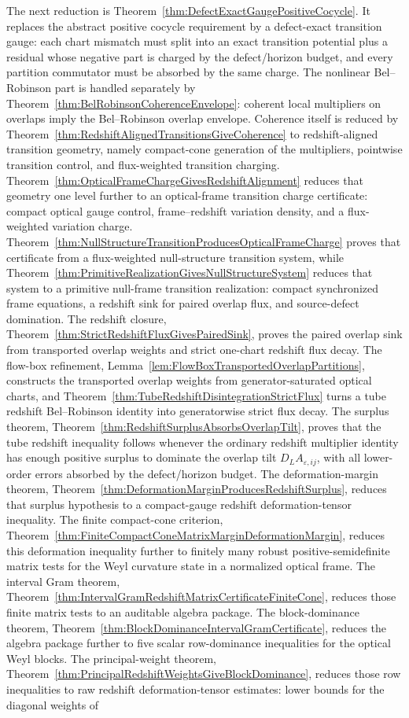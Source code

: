 The next reduction is Theorem~\ref{thm:DefectExactGaugePositiveCocycle}. It replaces the abstract positive cocycle requirement by a defect-exact transition gauge: each chart mismatch must split into an exact transition potential plus a residual whose negative part is charged by the defect/horizon budget, and every partition commutator must be absorbed by the same charge. The nonlinear Bel--Robinson part is handled separately by Theorem~\ref{thm:BelRobinsonCoherenceEnvelope}: coherent local multipliers on overlaps imply the Bel--Robinson overlap envelope. Coherence itself is reduced by Theorem~\ref{thm:RedshiftAlignedTransitionsGiveCoherence} to redshift-aligned transition geometry, namely compact-cone generation of the multipliers, pointwise transition control, and flux-weighted transition charging. Theorem~\ref{thm:OpticalFrameChargeGivesRedshiftAlignment} reduces that geometry one level further to an optical-frame transition charge certificate: compact optical gauge control, frame--redshift variation density, and a flux-weighted variation charge. Theorem~\ref{thm:NullStructureTransitionProducesOpticalFrameCharge} proves that certificate from a flux-weighted null-structure transition system, while Theorem~\ref{thm:PrimitiveRealizationGivesNullStructureSystem} reduces that system to a primitive null-frame transition realization: compact synchronized frame equations, a redshift sink for paired overlap flux, and source-defect domination. The redshift closure, Theorem~\ref{thm:StrictRedshiftFluxGivesPairedSink}, proves the paired overlap sink from transported overlap weights and strict one-chart redshift flux decay. The flow-box refinement, Lemma~\ref{lem:FlowBoxTransportedOverlapPartitions}, constructs the transported overlap weights from generator-saturated optical charts, and Theorem~\ref{thm:TubeRedshiftDisintegrationStrictFlux} turns a tube redshift Bel--Robinson identity into generatorwise strict flux decay. The surplus theorem, Theorem~\ref{thm:RedshiftSurplusAbsorbsOverlapTilt}, proves that the tube redshift inequality follows whenever the ordinary redshift multiplier identity has enough positive surplus to dominate the overlap tilt $D_LA_{\varepsilon,ij}$, with all lower-order errors absorbed by the defect/horizon budget. The deformation-margin theorem, Theorem~\ref{thm:DeformationMarginProducesRedshiftSurplus}, reduces that surplus hypothesis to a compact-gauge redshift deformation-tensor inequality. The finite compact-cone criterion, Theorem~\ref{thm:FiniteCompactConeMatrixMarginDeformationMargin}, reduces this deformation inequality further to finitely many robust positive-semidefinite matrix tests for the Weyl curvature state in a normalized optical frame. The interval Gram theorem, Theorem~\ref{thm:IntervalGramRedshiftMatrixCertificateFiniteCone}, reduces those finite matrix tests to an auditable algebra package. The block-dominance theorem, Theorem~\ref{thm:BlockDominanceIntervalGramCertificate}, reduces the algebra package further to five scalar row-dominance inequalities for the optical Weyl blocks. The principal-weight theorem, Theorem~\ref{thm:PrincipalRedshiftWeightsGiveBlockDominance}, reduces those row inequalities to raw redshift deformation-tensor estimates: lower bounds for the diagonal weights of 